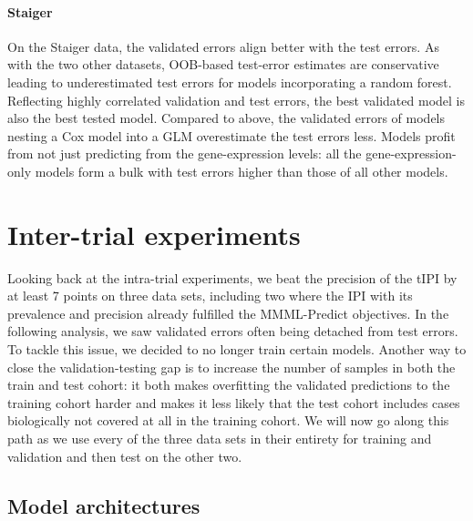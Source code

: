 \paragraph{Staiger}

On the Staiger data, the validated errors align better with the test errors. As with the two other 
datasets, OOB-based test-error estimates are conservative leading to underestimated test errors 
for models incorporating a random forest. Reflecting highly correlated validation and test 
errors, the best validated model is also the best tested model. Compared to above, the validated 
errors of models nesting a Cox model into a GLM overestimate the test errors less.
Models profit from not just predicting from the gene-expression levels: 
all the gene-expression-only models form a bulk with test errors higher than those of all other 
models. 

\section{Inter-trial experiments}\label{sec:inter-trial}

Looking back at the intra-trial experiments, we beat the precision of the tIPI by 
at least \num{7} points on three data sets, including two where the IPI with its prevalence 
and precision already fulfilled the MMML-Predict objectives. 
In the following analysis, we saw validated errors often being detached from test errors. To tackle 
this issue, we decided to no longer train certain models. Another way to close the 
validation-testing gap is to increase the number of samples 
in both the train and test cohort: it both makes overfitting the validated predictions to the 
training cohort harder and makes it less likely that the test cohort includes cases biologically 
not covered at all in the training cohort. We will now go along this path as we use every of the 
three data sets in their entirety for training and validation and then test on the other two.

\subsection{Model architectures}

